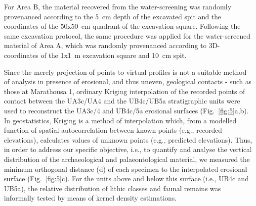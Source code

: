 \documentclass[preprint,authoryear,times]{elsarticle} %
\begin{document}
\begin{table}[]
  \caption{List of sampled observations for the vertical distribution and point pattern analyses.}
  \label{tab:2}
  \vspace{0.1in}
\end{table}

For Area B, the material recovered from the water-screening was randomly provenanced according to the 5~cm depth of the excavated spit and the coordinates of the 50x50~cm quadrant of the excavation square. Following the same excavation protocol, the same procedure was applied for the water-screened material of Area A, which was randomly provenanced according to 3D-coordinates of the 1x1~m excavation square and 10~cm spit.

Since the merely projection of points to virtual profiles is not a suitable method of analysis in presence of erosional, and thus uneven, geological contacts - such as those at Marathousa 1, ordinary Kriging interpolation of the recorded points of contact between the UA3c/UA4 and the UB4c/UB5a stratigraphic units were used to reconstruct the UA3c/4 and UB4c/5a erosional surfaces (Fig.~\ref{fig:5}a,b). In geostatistics, Kriging is a method of interpolation which, from a modelled function of spatial autocorrelation between known points (e.g., recorded elevations), calculates values of unknown points (e.g., predicted elevations). Thus, in order to address our specific objective, i.e., to quantify and analyse the vertical distribution of the archaeological and palaeontological material, we measured the minimum orthogonal distance (d) of each specimen to the interpolated erosional surface (Fig.~\ref{fig:5}c). For the units above and below this surface (i.e., UB4c and UB5a), the relative distribution of lithic classes and faunal remains was informally tested by means of kernel density estimations.
\end{document}
